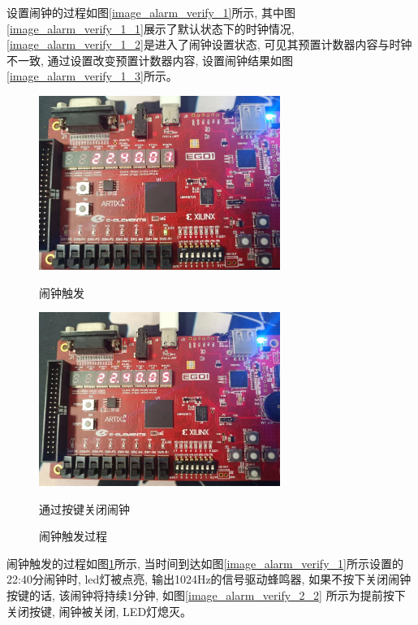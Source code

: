 \documentclass{article}
\begin{document}
设置闹钟的过程如图\ref{image_alarm_verify_1}所示, 其中图\ref{image_alarm_verify_1_1}展示了默认状态下的时钟情况,
\ref{image_alarm_verify_1_2}是进入了闹钟设置状态, 可见其预置计数器内容与时钟不一致, 通过设置改变预置计数器内容, 
设置闹钟结果如图\ref{image_alarm_verify_1_3}所示。\\
\begin{figure}[H]
    \begin{minipage}[t]{0.45\linewidth}
        \centering
        \includegraphics[width=0.7\textwidth]{image/2024-06-26-09-09-13.png}
        \caption{闹钟触发}
        \label{image_alarm_verify_2_1}
    \end{minipage}
    \begin{minipage}[t]{0.45\linewidth}
        \centering
        \includegraphics[width=0.7\textwidth]{image/2024-06-26-09-09-39.png}
        \caption{通过按键关闭闹钟}
        \label{image_alarm_verify_2_2}
    \end{minipage}
    \caption{闹钟触发过程}
    \label{image_alarm_verify_2}
\end{figure}
闹钟触发的过程如图\ref{image_alarm_verify_2}所示, 当时间到达如图\ref{image_alarm_verify_1}所示设置的22:40分闹钟时,
led灯被点亮, 输出1024Hz的信号驱动蜂鸣器, 如果不按下关闭闹钟按键的话, 该闹钟将持续1分钟, 如图\ref{image_alarm_verify_2_2}
所示为提前按下关闭按键, 闹钟被关闭, LED灯熄灭。 
\end{document}
